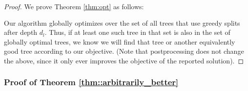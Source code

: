 \begin{proof}
    We prove Theorem \ref{thm:opt} as follows:
    
    Our algorithm globally optimizes over the set of all trees that use greedy splits after depth $d_{l}$. Thus, if at least one such tree in that set is also in the set of globally optimal trees, we know we will find that tree or another equivalently good tree according to our objective. (Note that postprocessing does not change the above, since it only ever improves the objective of the reported solution). 
\end{proof}

\subsubsection{Proof of Theorem \ref{thm::arbitrarily_better}}
\arbitrarilybetter*
